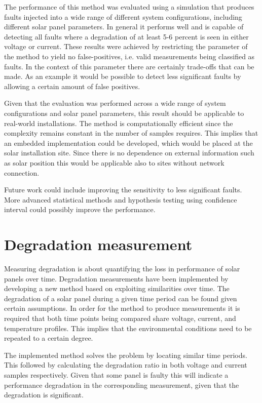 The performance of this method was evaluated using a simulation that produces faults injected into a wide range of different system configurations, including different solar panel parameters.
In general it performs well and is capable of detecting all faults where a degradation of at least 5-6 percent is seen in either voltage or current.
These results were achieved by restricting the parameter of the method to yield no false-positives, i.e. valid measurements being classified as faults.
In the context of this parameter there are certainly trade-offs that can be made.
As an example it would be possible to detect less significant faults by allowing a certain amount of false positives.

Given that the evaluation was performed across a wide range of system configurations and solar panel parameters, this result should be applicable to real-world installations.
The method is computationally efficient since the complexity remains constant in the number of samples requires.
This implies that an embedded implementation could be developed, which would be placed at the solar installation site.
Since there is no dependence on external information such as solar position this would be applicable also to sites without network connection.

Future work could include improving the sensitivity to less significant faults.
More advanced statistical methods and hypothesis testing using confidence interval could possibly improve the performance.

\section{Degradation measurement}
Measuring degradation is about quantifying the loss in performance of solar panels over time.
Degradation measurements have been implemented by developing a new method based on exploiting similarities over time.
The degradation of a solar panel during a given time period can be found given certain assumptions.
In order for the method to produce measurements it is required that both time points being compared share voltage, current, and temperature profiles.
This implies that the environmental conditions need to be repeated to a certain degree.

The implemented method solves the problem by locating similar time periods.
This followed by calculating the degradation ratio in both voltage and current samples respectively.
Given that some panel is faulty this will indicate a performance degradation in the corresponding measurement, given that the degradation is significant.

